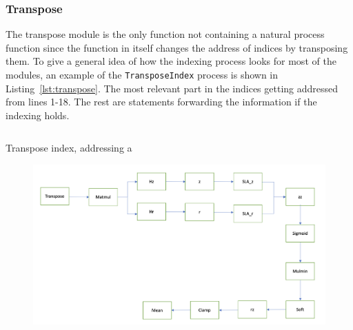 \subsubsection{Transpose}
The transpose module is the only function not containing a natural process function since the function in itself changes the address of indices by transposing them.
To give a general idea of how the indexing process looks for most of the modules, an example of the \texttt{TransposeIndex} process is shown in Listing~\ref{lst:transpose}. The most relevant part in the indices getting addressed from lines 1-18. The rest are statements forwarding the information if the indexing holds. 

\begin{listing}
  \inputminted{csharp}{codesnippets/transpose.cs}
  \caption{Transpose index, addressing a }
  \label{lst:transpose}
\end{listing}



\begin{figure}
  \centering
  \includegraphics[width=1\linewidth]{Pictures/fnn_sme.png}
  \caption{
  }
  \label{fig:fnn_sme}
\end{figure}

